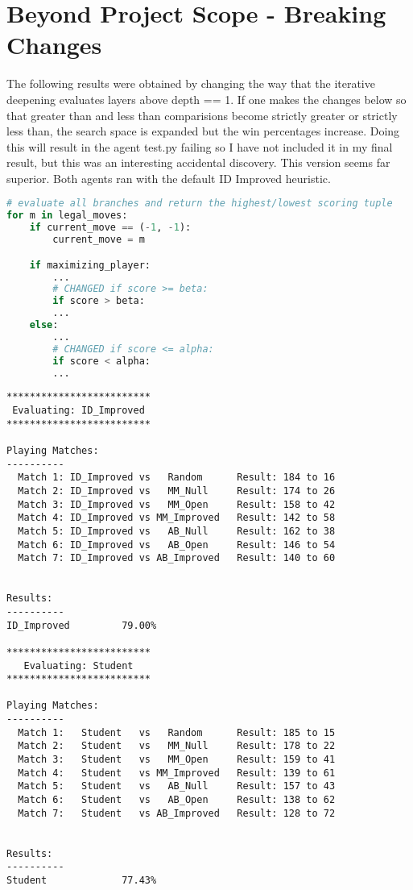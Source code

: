 \documentclass[10pt, a4paper]{article}
\begin{document}
\section{Beyond Project Scope - Breaking Changes}

The following results were obtained by changing the way that the iterative deepening
evaluates layers above depth == 1.  If one makes the changes below so that greater than and
less than comparisions become strictly greater or strictly less than, the search space is
expanded but the win percentages increase.  Doing this will result in the agent test.py
failing so I have not included it in my final result, but this was an interesting accidental
discovery.  This version seems far superior.  Both agents ran with the default ID Improved heuristic.

\begin{lstlisting}[language=Python]
# evaluate all branches and return the highest/lowest scoring tuple
for m in legal_moves:
	if current_move == (-1, -1):
		current_move = m

	if maximizing_player:
		...
		# CHANGED if score >= beta:
		if score > beta:
		...
	else:	
		...
		# CHANGED if score <= alpha:
		if score < alpha:
		...
\end{lstlisting}

\begin{verbatim}
*************************
 Evaluating: ID_Improved 
*************************

Playing Matches:
----------
  Match 1: ID_Improved vs   Random    	Result: 184 to 16
  Match 2: ID_Improved vs   MM_Null   	Result: 174 to 26
  Match 3: ID_Improved vs   MM_Open   	Result: 158 to 42
  Match 4: ID_Improved vs MM_Improved 	Result: 142 to 58
  Match 5: ID_Improved vs   AB_Null   	Result: 162 to 38
  Match 6: ID_Improved vs   AB_Open   	Result: 146 to 54
  Match 7: ID_Improved vs AB_Improved 	Result: 140 to 60


Results:
----------
ID_Improved         79.00%

*************************
   Evaluating: Student   
*************************

Playing Matches:
----------
  Match 1:   Student   vs   Random    	Result: 185 to 15
  Match 2:   Student   vs   MM_Null   	Result: 178 to 22
  Match 3:   Student   vs   MM_Open   	Result: 159 to 41
  Match 4:   Student   vs MM_Improved 	Result: 139 to 61
  Match 5:   Student   vs   AB_Null   	Result: 157 to 43
  Match 6:   Student   vs   AB_Open   	Result: 138 to 62
  Match 7:   Student   vs AB_Improved 	Result: 128 to 72


Results:
----------
Student             77.43%
\end{verbatim}
\end{document}
